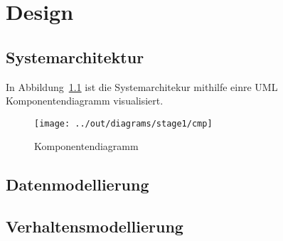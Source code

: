 \chapter{Design}\label{ch:design}



\section{Systemarchitektur}\label{sec:systemarchitektur}


In Abbildung~\ref{fig:cmp} ist die Systemarchitekur mithilfe einre UML Komponentendiagramm
visualisiert.

\begin{figure}[h]
    \centering
    \texttt{[image: ../out/diagrams/stage1/cmp]}
    \caption{Komponentendiagramm}
    \label{fig:cmp}
\end{figure}

\section{Datenmodellierung}\label{sec:datenmodellierung}



\section{Verhaltensmodellierung}\label{sec:verhaltensmodellierung}


